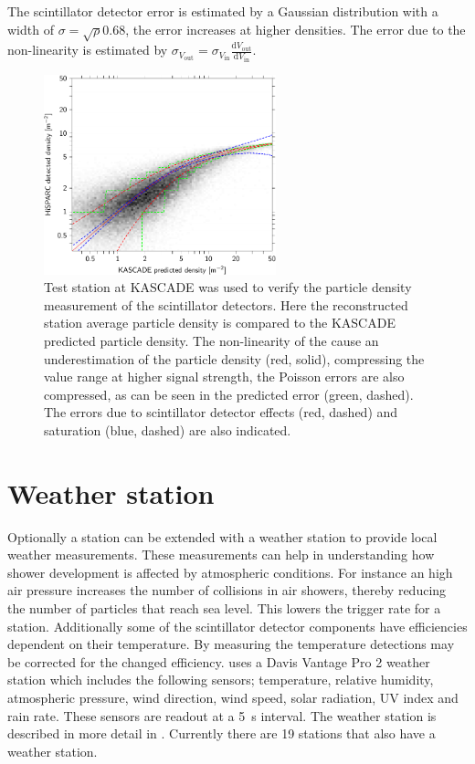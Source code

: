 The scintillator detector error is estimated by a Gaussian distribution with a width of $\sigma = \sqrt{\rho} 0.68$, the error increases at higher densities. The error due to the non-linearity is estimated by $\sigma_{V_{\mathrm{out}}} = \sigma_{V_{\mathrm{in}}} \frac{\mathrm{d}V_{\mathrm{out}}}{\mathrm{d}V_{\mathrm{in}}}$.

\begin{figure}
    \centering
    \includegraphics[width=0.6\textwidth]
                    {plots/station/hisparc_v_kascade_average}
    \caption{Test station at KASCADE was used to verify the particle density measurement of the scintillator detectors. Here the reconstructed station average particle density is compared to the KASCADE predicted particle density. The non-linearity of the \pmts cause an underestimation of the \hisparc particle density (red, solid), compressing the value range at higher signal strength, the Poisson errors are also compressed, as can be seen in the predicted error (green, dashed). The errors due to scintillator detector effects (red, dashed) and \pmt saturation (blue, dashed) are also indicated.}
    \label{hisparc_v_kascade_average}
\end{figure}


\section{Weather station}

Optionally a \hisparc station can be extended with a weather station to provide local weather measurements. These measurements can help in understanding how shower development is affected by atmospheric conditions. For instance an high air pressure increases the number of collisions in air showers, thereby reducing the number of particles that reach sea level. This lowers the trigger rate for a station. Additionally some of the scintillator detector components have efficiencies dependent on their temperature. By measuring the temperature detections may be corrected for the changed efficiency. \hisparc uses a Davis Vantage Pro 2 weather station \cite{davis2012vantagepro} which includes the following sensors; temperature, relative humidity, atmospheric pressure, wind direction, wind speed, solar radiation, UV index and rain rate. These sensors are readout at a \SI{5}{\second} interval. The weather station is described in more detail in \cite{devries2012weather}. Currently there are 19 \hisparc stations that also have a weather station.

